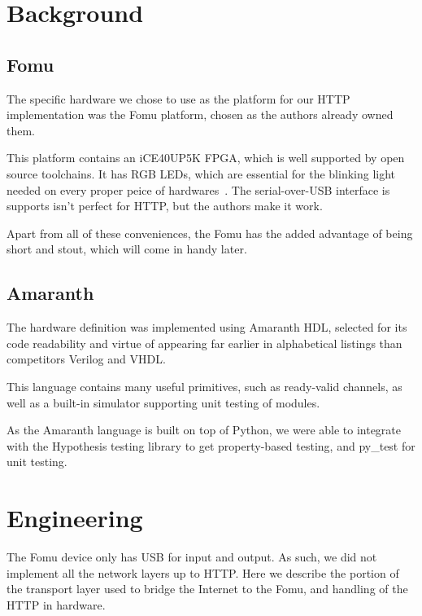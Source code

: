 \documentclass[sigconf,authorversion,nonacm]{acmart}
\begin{document}
\section{Background}

\subsection{Fomu}

The specific hardware we chose to use as the platform for our HTTP implementation was the 
Fomu\cite{fomu} platform, chosen as the authors already owned them.

This platform contains an iCE40UP5K FPGA, which is well supported by open source toolchains. 
It has RGB LEDs, which are essential for the blinking light needed on every proper peice of hardwares~\cite{jargonfile_blinkenlights}.
The serial-over-USB interface is supports isn't perfect for HTTP, but the authors make it work.

Apart from all of these conveniences, the Fomu has the added advantage of being short and stout, which will come in handy later.


\subsection{Amaranth}

The hardware definition was implemented using Amaranth HDL\cite{amaranth}, selected for its code readability and virtue of appearing far earlier in alphabetical listings than competitors Verilog and VHDL.

This language contains many useful primitives, such as ready-valid channels,
as well as a built-in simulator supporting unit testing of modules.

As the Amaranth language is built on top of Python, we were able to integrate with the 
Hypothesis\cite{MacIver2019Hypothesis} testing library to get property-based testing, and
py\_test\cite{pytest8.3} for unit testing.

\section{Engineering}

The Fomu device only has USB for input and output. As such, we did not implement all the network layers up to HTTP.
Here we describe the portion of the transport layer used to bridge the Internet to the Fomu, and handling of the HTTP in hardware.
\end{document}
